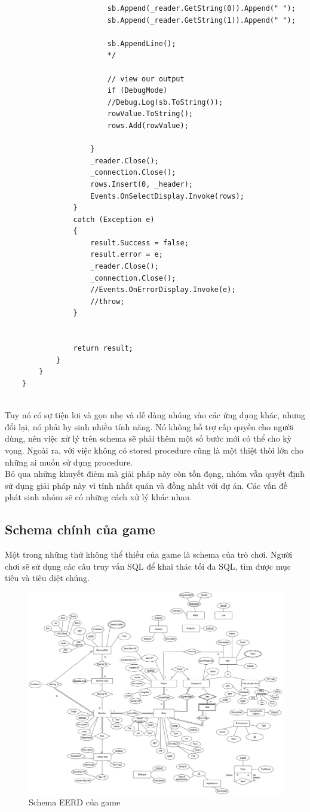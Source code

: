 \begin{verbatim}
						sb.Append(_reader.GetString(0)).Append(" ");
						sb.Append(_reader.GetString(1)).Append(" ");
						
						sb.AppendLine();
						*/
						
						// view our output
						if (DebugMode)
						//Debug.Log(sb.ToString());
						rowValue.ToString();
						rows.Add(rowValue);
						
					}
					_reader.Close();
					_connection.Close();
					rows.Insert(0, _header);
					Events.OnSelectDisplay.Invoke(rows);
				}
				catch (Exception e)
				{
					result.Success = false;
					result.error = e;
					_reader.Close();
					_connection.Close();
					//Events.OnErrorDisplay.Invoke(e);
					//throw;
				}
				
				
				return result;
			}
		}
	}
	
\end{verbatim}
\hspace*{1cm} Tuy nó có sự tiện lơi và gọn nhẹ và dễ dàng nhúng vào các ứng dụng khác, nhưng đổi lại, nó phải hy sinh nhiều tính năng. Nó không hỗ trợ cấp quyền cho người dùng, nên việc xử lý trên schema sẽ phải thêm một số bước mới có thể cho kỳ vọng. Ngoài ra, với việc không có stored procedure cũng là một thiệt thòi lớn cho những ai muốn sử dụng procedure.\\
\hspace*{1cm} Bỏ qua những khuyết điẻm mà giải pháp này còn tồn đọng, nhóm vẫn quyết định sử dụng giải pháp này vì tính nhất quán và đồng nhất với dự án. Các vấn đề phát sinh nhóm sẽ có những cách xử lý khác nhau.
\subsection{Schema chính của game}
\hspace*{1cm} Một trong những thứ không thể thiếu của game là schema của trò chơi. Người chơi sẽ sử dụng các câu truy vấn SQL để khai thác tối đa SQL, tìm được mục tiêu và tiêu diệt chúng.
\begin{figure}[H]
	\centering
	\includegraphics[width=\textwidth]{Images/SchemaEERD.png}
	\vspace{0.5cm}
	\caption{Schema EERD của game}
\end{figure}

